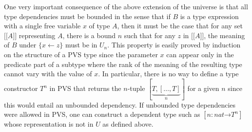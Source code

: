 \documentclass [12pt,twoside]{cslreport}
\newcommand{\aro}{\mathord\rightarrow} %
\newcommand{\mean}[1]{\lbrack\!\lbrack #1 \rbrack\!\rbrack}
\newcommand{\funtype}[2]{[#1 \aro #2]}
\begin{document}
One very important consequence of the above extension of the universe
is that all type dependencies must be bounded in the sense that
if $B$ is a type expression with a single free variable $x$ of type $A$,
then it must be the case that for any set $\mean{A}$ representing $A$,
there is a bound $n$ such that for any $z$ in $\mean{A}$, the meaning of 
$B$ under $\{x \gets z\}$ must be in $U_n$\@.  This property is easily
proved by induction on the structure of a PVS type since the parameter
$x$ can appear only in the predicate part of a subtype where the
rank of the meaning of the resulting type cannot vary with the value
of $x$\@.   In
particular, there is no way to define a type constructor $T^n$ in PVS that
returns the $n$-tuple $[\underbrace{T, [\ldots, T]}_n]$ for a given $n$
since this would entail an unbounded dependency.  
If unbounded type dependencies were allowed in PVS,
one can construct a dependent type such as $\funtype{n : nat}{T^n}$
whose representation is not in $U$ as defined above.    
  

\begin{comment}
A simpler alternative might be to define a second universe
U2 which starts from U1 and adds the dependent types.  This will work fine
in the absence of parametric theories since each type contains only a
fixed number of type dependencies.  The introduction of parametric
theories might require a third iteration since they introduce a third
form of dependency.
\end{comment}
\end{document}
